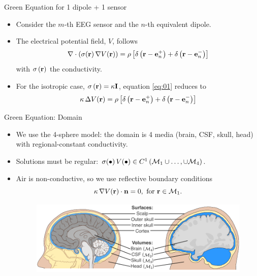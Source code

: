 \documentclass[progressbar=head]{beamer}
\begin{document}
\begin{frame}{Green Equation for 1 dipole + 1 sensor}
\begin{itemize}
\item Consider the $m$-th EEG sensor and the $n$-th equivalent dipole.
\item The electrical potential field, $V$, follows
\begin{equation}
\nabla \cdot\left( \sigma(\mathbf{r})\, \nabla V(\mathbf{r})  \right) = 
\rho\left[  \delta\left( \mathbf{r}-\mathbf{e}_n^+ \right) + \delta\left( \mathbf{r}-\mathbf{e}_n^- \right)  \right]
\label{eq:01}
\end{equation}
with $\sigma\left( \mathbf{r} \right)$ the conductivity.
\item For the isotropic case, $\sigma\left( \mathbf{r} \right)= \kappa \mathbf{I}$, equation \ref{eq:01} reduces to 
\begin{equation}
\kappa\, \Delta { V(\mathbf{r}) } = 
\rho\left[  \delta\left( \mathbf{r}-\mathbf{e}_n^+ \right) + \delta\left( \mathbf{r}-\mathbf{e}_n^- \right)  \right]
\label{eq:02}
\end{equation}
\end{itemize}
\end{frame}

\begin{frame}{Green Equation: Domain}
\begin{itemize}
\item We use the 4-sphere model: the domain is 4 media (brain, CSF, skull, head) with regional-constant conductivity.
\item Solutions must be regular:
$\sigma(\bullet)\, V(\bullet) \in C^1 \left( \mathcal{M}_1 \cup \dots, \cup \mathcal{M}_4 \right)$.
\item Air is non-conductive, so we use reflective boundary conditions
\begin{equation}
\kappa\, \nabla V(\mathbf{r}) \cdot \mathbf{n} = 0, \text{ for } \mathbf{r}\in \mathcal{M}_1.
\end{equation}
\begin{figure}
\centering
\includegraphics[width=0.8\linewidth]{./img/HeadSurfacesVolumes}
\end{figure}
\end{itemize}
\end{frame}
\end{document}
